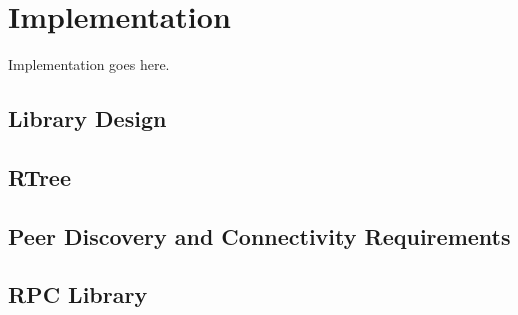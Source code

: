 \section{Implementation} \label{section:implementation}
Implementation goes here.

\subsection{Library Design}

\subsection{RTree}

\subsection{Peer Discovery and Connectivity Requirements}

\subsection{RPC Library}
